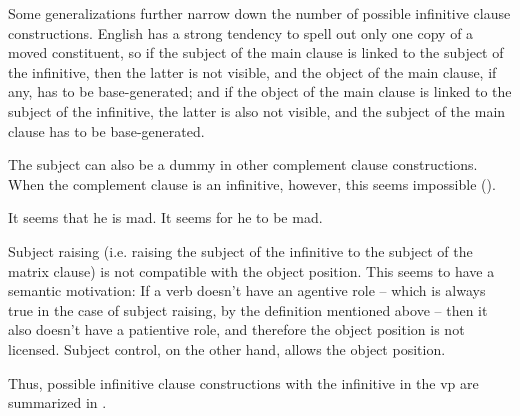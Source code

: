 \documentclass[UTF8, a4paper, oneside, scheme=plain, 12pt]{ctexbook}
\begin{document}
Some generalizations further narrow down 
the number of possible infinitive clause constructions.
English has a strong tendency to spell out only one copy of a moved constituent,
so if the subject of the main clause is linked to the subject of the infinitive,
then the latter is not visible,
and the object of the main clause, if any, has to be base-generated;
and if the object of the main clause is linked to the subject of the infinitive,
the latter is also not visible,
and the subject of the main clause has to be base-generated.

The subject can also be a dummy in other complement clause constructions.
When the complement clause is an infinitive, however, 
this seems impossible ().

\begin{exe}
    \ex\label{ex:complement.infinitive.no-dummy-subject}  \begin{xlist}
        \ex It seems that he is mad.
        \ex *It seems for he to be mad.
    \end{xlist}
\end{exe}

Subject raising (i.e. raising the subject of the infinitive to the subject of the matrix clause) 
is not compatible with the object position.
This seems to have a semantic motivation:
If a verb doesn't have an agentive role -- 
which is always true in the case of subject raising,
by the definition mentioned above -- 
then it also doesn't have a patientive role,
and therefore the object position is not licensed.
Subject control, on the other hand, allows the object position.

Thus, possible infinitive clause constructions with 
the infinitive in the \acs{vp} are summarized 
in .
\end{document}
